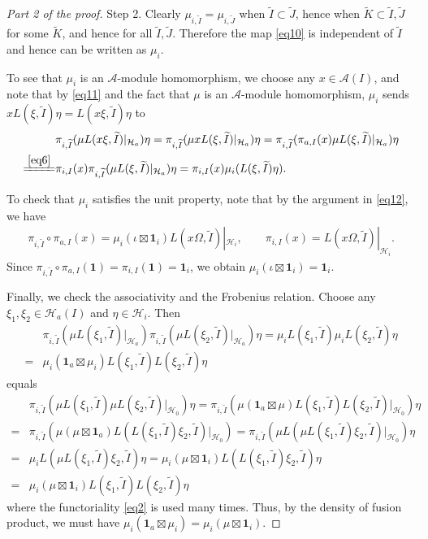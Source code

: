 \documentclass[11pt,b5paper,notitlepage]{article}
\theoremstyle{definition}
\theoremstyle{plain}
\newcommand{\mc}{\mathcal}
\newcommand{\wtd}{\widetilde}
\newcommand{\id}{\mathbf{1}}
\numberwithin{equation}{section}
\begin{document}
\begin{proof}[Part 2 of the proof]
Step 2. Clearly $\mu_{i,\wtd I}=\mu_{i,\wtd J}$ when $\wtd I\subset \wtd J$, hence when $\wtd K\subset\wtd I,\wtd J$ for some $\wtd K$, and hence for all $\wtd I,\wtd J$. Therefore the map \eqref{eq10} is independent of  $\wtd I$ and hence can be written as $\mu_{i}$.

To see that $\mu_i$ is an $\mc A$-module homomorphism, we choose any $x\in\mc A(I)$, and note that by \eqref{eq11} and the fact that $\mu$ is an $\mc A$-module homomorphism, $\mu_i$ sends $xL(\xi,\wtd I)\eta=L(x\xi,\wtd I)\eta$ to
\begin{align*}
&\pi_{i,\wtd I}(\mu L(x\xi,\wtd I)|_{\mc H_a})\eta=\pi_{i,\wtd I}(\mu xL(\xi,\wtd I)|_{\mc H_a})\eta=\pi_{i,\wtd I}(\pi_{a,I}(x)\mu L(\xi,\wtd I)|_{\mc H_a})\eta\\
\xlongequal{\eqref{eq6}}&\pi_{i,I}(x)\pi_{i,\wtd I}(\mu L(\xi,\wtd I)|_{\mc H_a})\eta=\pi_{i,I}(x)\mu_i(L(\xi,\wtd I)\eta).
\end{align*}

To check that $\mu_i$ satisfies the unit property, note that by the argument in \eqref{eq12}, we have
\begin{align*}
\pi_{i,\wtd I}\circ\pi_{a,I}(x)=\mu_i(\iota\boxtimes \id_i) L(x\Omega,\wtd I)|_{\mc H_i},\qquad \pi_{i,I}(x)=L(x\Omega,\wtd I)|_{\mc H_i}.
\end{align*}
Since $\pi_{i,\wtd I}\circ\pi_{a,I}(\id)=\pi_{i,I}(\id)=\id_i$, we obtain $\mu_i(\iota\boxtimes \id_i)=\id_i$.


Finally, we check the associativity and the Frobenius relation. Choose any $\xi_1,\xi_2\in\mc H_a(I)$ and $\eta\in\mc H_i$. Then
\begin{align*}
&\pi_{i,\wtd I}(\mu L(\xi_1,\wtd I)|_{\mc H_a})\pi_{i,\wtd I}(\mu L(\xi_2,\wtd I)|_{\mc H_a})\eta=\mu_i L(\xi_1,\wtd I)\mu_i L(\xi_2,\wtd I)\eta\\
=&\mu_i(\id_a\boxtimes\mu_i)L(\xi_1,\wtd I)L(\xi_2,\wtd I)\eta	
\end{align*}
equals
\begin{align*}
&\pi_{i,\wtd I}(\mu L(\xi_1,\wtd I)\mu L(\xi_2,\wtd I)|_{\mc H_0})\eta=\pi_{i,\wtd I}(\mu(\id_a\boxtimes\mu) L(\xi_1,\wtd I) L(\xi_2,\wtd I)|_{\mc H_0})\eta\\
=& \pi_{i,\wtd I}(\mu(\mu\boxtimes\id_a) L(L(\xi_1,\wtd I)\xi_2,\wtd I)|_{\mc H_0})	=\pi_{i,\wtd I}(\mu L(\mu L(\xi_1,\wtd I)\xi_2,\wtd I)|_{\mc H_0})\eta\\
=&\mu_i L(\mu L(\xi_1,\wtd I)\xi_2,\wtd I)\eta=\mu_i(\mu\boxtimes \id_i) L(L(\xi_1,\wtd I)\xi_2,\wtd I)\eta\\
=&\mu_i(\mu\boxtimes \id_i) L(\xi_1,\wtd I)L(\xi_2,\wtd I)\eta
\end{align*}
where the functoriality \eqref{eq2} is used many times. Thus, by the density of fusion product, we must have $\mu_i(\id_a\boxtimes\mu_i)=\mu_i(\mu\boxtimes\id_i)$.


\end{proof}
\end{document}

